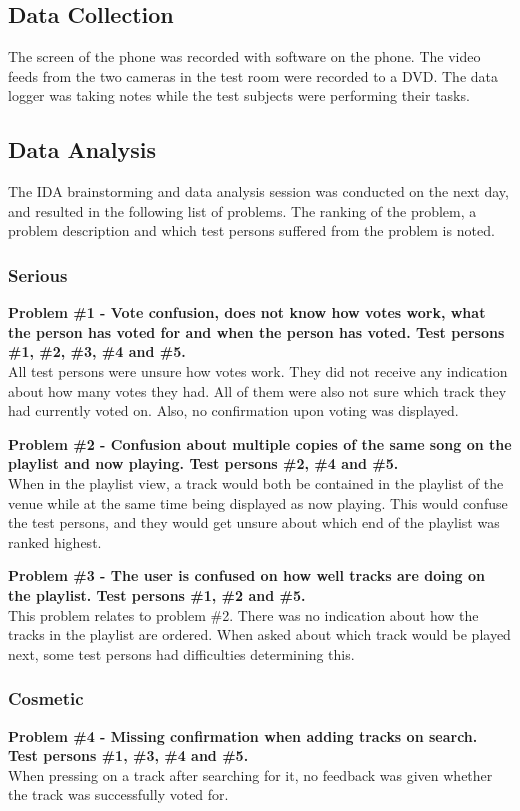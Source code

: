 \subsection{Data Collection}
The screen of the phone was recorded with software on the phone. The
video feeds from the two cameras in the test room were recorded to a
DVD. The data logger was taking notes while the test subjects were
performing their tasks.

\subsection{Data Analysis}
The IDA brainstorming and data analysis session was conducted on the next
day, and resulted in the following list of problems. The ranking of
the problem, a problem description and which test persons suffered
from the problem is noted.

\subsubsection{Serious}
\textbf{Problem \#1 - Vote confusion, does not know how votes work, what the person has
    voted for and when the person has voted. Test persons \#1, \#2,
    \#3, \#4 and \#5.}\\
  All test persons were unsure how votes work. They did not receive
  any indication about how many votes they had. All of them were also
  not sure which track they had currently voted on. Also, no
  confirmation upon voting was displayed.

\noindent\textbf{Problem \#2 - Confusion about multiple copies of the same song on the playlist
    and now playing. Test persons \#2, \#4 and \#5.}\\
  When in the playlist view, a track would both be contained in the
  playlist of the venue while at the same time being displayed as now
  playing. This would confuse the test persons, and they would get
  unsure about which end of the playlist was ranked highest.

\noindent\textbf{Problem \#3 - The user is confused on how well tracks are doing on the
    playlist. Test persons \#1, \#2 and \#5.}\\
  This problem relates to problem \#2. There was no indication about
  how the tracks in the playlist are ordered. When asked about which
  track would be played next, some test persons had difficulties
  determining this.

\subsubsection{Cosmetic}
\textbf{Problem \#4 - Missing confirmation when adding tracks on search. Test persons
    \#1, \#3, \#4 and \#5.}\\
  When pressing on a track after searching for it, no feedback was
  given whether the track was successfully voted for.

